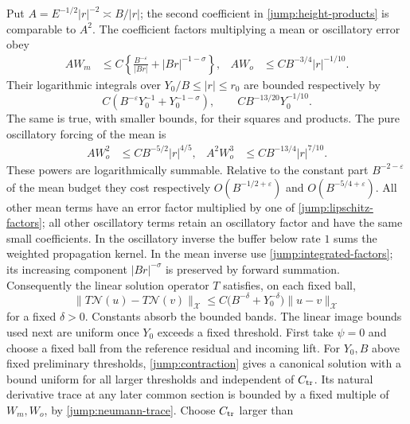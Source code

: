 Put $A=E^{-1/2}|r|^{-2}\asymp B/|r|$; the second coefficient in
\eqref{jump:height-products} is comparable to $A^2$.  The coefficient
factors multiplying a mean or oscillatory error obey
\begin{align}
 AW_m&\leq C\left\{\frac{B^{-\varepsilon}}{|Br|}
                         +|Br|^{-1-\sigma}\right\},
 &AW_o&\leq CB^{-3/4}|r|^{-1/10}.
 \label{jump:lipschitz-factors}
\end{align}
Their logarithmic integrals over $Y_0/B\leq |r|\leq r_0$ are bounded
respectively by
\begin{equation}\label{jump:integrated-factors}
 C(B^{-\varepsilon}Y_0^{-1}+Y_0^{-1-\sigma}),
 \qquad CB^{-13/20}Y_0^{-1/10}.
\end{equation}
The same is true, with smaller bounds, for their squares and products.
The pure oscillatory forcing of the mean is
\begin{align}
 AW_o^2&\leq CB^{-5/2}|r|^{4/5},&
 A^2W_o^3&\leq CB^{-13/4}|r|^{7/10}.
 \label{jump:osc-to-mean}
\end{align}
These powers are logarithmically summable.  Relative to the constant
part $B^{-2-\varepsilon}$ of the mean budget they cost respectively
$O(B^{-1/2+\varepsilon})$ and $O(B^{-5/4+\varepsilon})$.
All other mean terms have an error factor multiplied by one of
\eqref{jump:lipschitz-factors}; all other oscillatory terms retain an
oscillatory factor and have the same small coefficients.  In the
oscillatory inverse the buffer below rate $1$ sums the weighted
propagation kernel.  In the mean inverse use
\eqref{jump:integrated-factors}; its increasing component
$|Br|^{-\sigma}$ is preserved by forward summation.  Consequently the
linear solution operator $T$ satisfies, on each fixed ball,
\begin{equation}\label{jump:contraction}
 \|T\mathcal N(u)-T\mathcal N(v)\|_{\mathcal X}
 \leq C\bigl(B^{-\delta}+Y_0^{-\delta}\bigr)
                           \|u-v\|_{\mathcal X}
\end{equation}
for a fixed $\delta>0$.  Constants absorb the bounded bands.
The linear image bounds used next are uniform once $Y_0$ exceeds
a fixed threshold.
First take $\psi=0$ and choose a fixed ball from the reference
residual and incoming lift.  For $Y_0,B$ above fixed preliminary
thresholds, \eqref{jump:contraction} gives a canonical solution
with a bound uniform for all larger thresholds and independent
of $C_{\rm tr}$.  Its natural derivative trace at any later common
section is bounded by a fixed multiple of $W_m,W_o$, by
\eqref{jump:neumann-trace}.  Choose $C_{\rm tr}$ larger than
